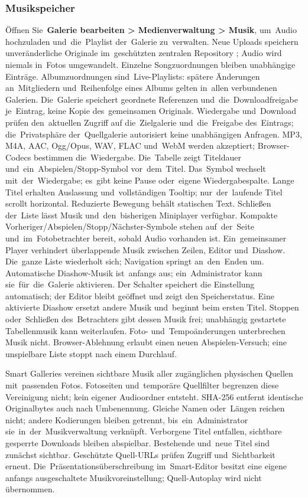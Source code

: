 \documentclass[11pt,a4paper]{article}
\newcommand{\filepath}[1]{\path{#1}}
\newcommand{\ui}[1]{\textbf{#1}}
\begin{document}
\subsubsection{Musikspeicher}

Öffnen Sie~\ui{Galerie bearbeiten > Medienverwaltung > Musik}, um~Audio
hochzuladen
und~die~Playlist der~Galerie zu~verwalten. Neue Uploads speichern
unveränderliche
Originale im~geschützten zentralen Repository \filepath{data/music/}; Audio wird
niemals in~Fotos umgewandelt. Einzelne Songzuordnungen bleiben unabhängige
Einträge. Albumzuordnungen sind~Live-Playlists: spätere Änderungen
an~Mitgliedern
und~Reihenfolge eines Albums gelten in~allen verbundenen Galerien. Die~Galerie
speichert geordnete Referenzen und~die~Downloadfreigabe je~Eintrag, keine Kopie
des~gemeinsamen Originals. Wiedergabe und~Download prüfen den~aktuellen Zugriff
auf die~Zielgalerie und~die~Freigabe des~Eintrags; die~Privatsphäre
der~Quellgalerie
autorisiert keine unabhängigen Anfragen. MP3, M4A, AAC, Ogg/Opus, WAV, FLAC
und~WebM werden akzeptiert; Browser-Codecs bestimmen die~Wiedergabe.
Die~Tabelle zeigt Titeldauer und~ein~Abspielen/Stopp-Symbol vor~dem~Titel.
Das~Symbol wechselt mit~der~Wiedergabe; es~gibt keine Pause oder~eigene
Wiedergabespalte. Lange Titel erhalten Auslassung und~vollständigen Tooltip;
nur~der~laufende Titel scrollt horizontal. Reduzierte Bewegung behält
statischen Text. Schließen der~Liste lässt Musik und~den~bisherigen
Miniplayer verfügbar. Kompakte
Vorheriger/Abspielen/Stopp/Nächster-Symbole stehen auf~der~Seite
und~im~Fotobetrachter bereit, sobald Audio vorhanden ist. Ein~gemeinsamer
Player verhindert überlappende Musik zwischen Zeilen, Editor und~Diashow.
Die~ganze Liste wiederholt sich; Navigation springt an~den~Enden um.
Automatische Diashow-Musik ist~anfangs aus; ein~Administrator kann
sie~für~die~Galerie aktivieren. Der Schalter speichert die Einstellung
automatisch; der Editor bleibt geöffnet und zeigt den Speicherstatus.
Eine aktivierte Diashow ersetzt andere Musik
und~beginnt beim ersten Titel. Stoppen oder~Schließen des~Betrachters gibt
dessen Musik frei; unabhängig gestartete Tabellenmusik kann weiterlaufen. Foto-
und~Tempoänderungen unterbrechen Musik nicht. Browser-Ablehnung erlaubt einen
neuen Abspielen-Versuch; eine unspielbare Liste stoppt nach einem Durchlauf.

Smart Galleries vereinen sichtbare Musik aller zugänglichen physischen
Quellen mit~passenden Fotos. Fotoseiten und~temporäre Quellfilter begrenzen
diese Vereinigung nicht; kein eigener Audioordner entsteht. SHA-256 entfernt
identische Originalbytes auch nach Umbenennung. Gleiche Namen oder~Längen
reichen nicht; andere Kodierungen bleiben getrennt, bis~ein~Administrator
sie~in~der~Musikverwaltung verknüpft. Verborgene Titel entfallen, sichtbare
gesperrte
Downloads bleiben abspielbar. Bestehende und~neue Titel sind zunächst
sichtbar. Geschützte Quell-URLs prüfen Zugriff und~Sichtbarkeit erneut.
Die~Präsentationsüberschreibung im~Smart-Editor besitzt eine eigene anfangs
ausgeschaltete Musikvoreinstellung; Quell-Autoplay wird nicht übernommen.
\end{document}
